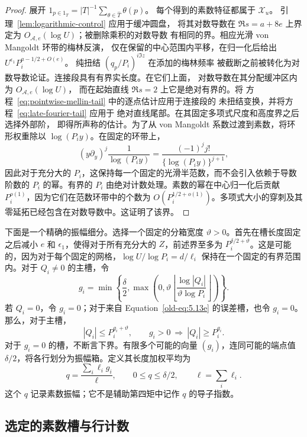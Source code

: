 \documentclass[11pt,a4paper]{article}
\numberwithin{equation}{section}
\numberwithin{figure}{section}
\theoremstyle{definition}
\theoremstyle{remark}
\begin{document}
\begin{proof}
展开 \(1_{p\in1_T}=|T|^{-1}\sum_{\theta\in\widehat T}\theta(p)\)。
每个得到的素数特征都属于 \(\mathcal X_u\)。
引理~\ref{lem:logarithmic-control} 应用于缓冲圆盘，
将其对数导数在 \(\Re s=a+8e\) 上界定为
\(O_{\mathcal A,e}(\log U)\)；被删除乘积的对数导数
有相同的界。相应光滑 von Mangoldt 环带的梅林反演，
仅在保留的中心范围内平移，在归一化后给出
\(U^{\epsilon_1}P_i^{a-1/2+O(e)}\)。
纯扭结 \((q_p/P_i)^{i\Im z}\) 在添加的梅林频率
被截断之前被转化为对数导数论证。连接段具有有界实长度。在它们上面，
对数导数在其分配缓冲区内为 \(O_{\mathcal A,e}(\log U)\)，
而在起始直线 \(\Re s=2\) 上它是绝对有界的。将
方程~\eqref{eq:pointwise-mellin-tail} 中的逐点估计应用于连接段的
未扭结变换，并将方程~\eqref{eq:late-fourier-tail} 应用于
绝对直线尾部。在其固定多项式尺度和高度界之后选择外部阶，
即得所声称的估计。为了从 von Mangoldt 系数过渡到素数，将环形权重除以 \(\log(P_i y)\)。在固定的环带上，
\[
 (y\partial_y)^j\frac1{\log(P_i y)}
 =\frac{(-1)^j j!}{\{\log(P_i y)\}^{j+1}},
\]
因此对于充分大的 \(P_i\)，这保持每一个固定的光滑半范数，而不会引入依赖于导数阶数的 \(P_i\) 的幂。有界的 \(P_i\) 由绝对计数处理。素数的幂在中心归一化后贡献 \(P_i^{o(1)}\)，因为它们在范数环带中的个数为 \(O(P_i^{1/2+o(1)})\)。多项式大小的穿刺及其零延拓已经包含在对数导数中。这证明了该界。
\end{proof}

下面是一个精确的振幅细分。选择一个固定的分箱宽度 \(\vartheta>0\)。首先在槽长度固定之后减小 \(e\) 和 \(\epsilon_1\)，使得对于所有充分大的 \(Z\)，前述界至多为 \(P_i^{\delta/2+\vartheta}\)。这是可能的，因为对于每个固定的网格，\(\log U/\log P_i=d/\ell_i\) 保持在一个固定的有界范围内。对于 \(Q_i\ne0\) 的主槽，令
\[
 g_i=\min\left\{\frac{\delta}{2},
   \max\left(0,\vartheta
     \left\lfloor\frac{\log|Q_i|}{\vartheta\log P_i}\right\rfloor
   \right)\right\}.
\]
若 \(Q_i=0\)，令 \(g_i=0\)；对于来自 Equation~\eqref{old-eq:5.13e} 的误差槽，也令 \(g_i=0\)。那么，对于主槽，
\[
 |Q_i|\le P_i^{g_i+\vartheta},\qquad
 g_i>0\ \Longrightarrow\ |Q_i|\ge P_i^{g_i}.
\]
对于 \(g_i=0\) 的槽，不断言下界。有限多个可能的向量 \((g_i)\)，连同可能的端点值 \(\delta/2\)，将各行划分为振幅箱。定义其长度加权平均为
\begin{equation}
 q=\frac{\sum_i\ell_i g_i}{\ell},\qquad
 0\le q\le\delta/2,\qquad \ell=\sum_i\ell_i.
 \label{old-eq:6.6}
\end{equation}
这个 \(q\) 记录素数振幅；它不是辅助第四矩中记作 \(q\) 的导子指数。

\subsection{选定的素数槽与行计数}\label{sec:selection}
\end{document}
